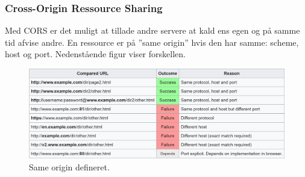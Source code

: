 \subsubsection{Cross-Origin Ressource Sharing}
Med CORS er det muligt at tillade andre servere at kald ens egen og på samme tid afvise andre. En ressource er på ''same origin'' hvis den har samme: scheme, host og port. Nedenstående figur viser forskellen.

\begin{figure}[h]
	\centering
	\includegraphics[width=\linewidth]{figs/spm6/cors-same-origin}
	\caption{Same origin defineret.}
	\label{fig:cors-same-origin}
\end{figure}
